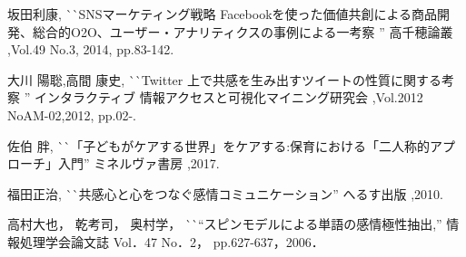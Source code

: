 \documentclass[dvipdfmx]{issj}
\begin{document}
\begin{thebibliography}{99}


   坂田利康, 
                       ^^ ^^ SNSマーケティング戦略 Facebookを使った価値共創による商品開発、総合的O2O、ユーザー・アナリティクスの事例による一考察 '' 
                       高千穂論叢 ,Vol.49 No.3, 2014, pp.83-142.

    大川 陽聡,高間 康史, 
                       ^^ ^^ Twitter 上で共感を生み出すツイートの性質に関する考察 '' 
                       インタラクティブ 情報アクセスと可視化マイニング研究会 ,Vol.2012 NoAM-02,2012, pp.02-.



   佐伯 胖,
                       ^^ ^^ 「子どもがケアする世界」をケアする:保育における「二人称的アプローチ」入門'' 
                       ミネルヴァ書房 ,2017.

   福田正治,
                       ^^ ^^ 共感心と心をつなぐ感情コミュニケーション'' 
                       へるす出版 ,2010.
  

   高村大也， 乾考司， 奥村学，
                       ^^ ^^ “スピンモデルによる単語の感情極性抽出,” 情報処理学会論文誌 Vol．47 No．2， pp.627-637，2006．





\end{thebibliography}
\end{document}
